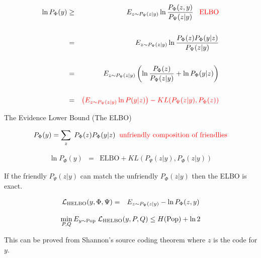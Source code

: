 {\huge
\begin{eqnarray*}
        \ln P_\Phi(y) & \geq & E_{z \sim P_\Psi(z|y)} \ln \frac{P_\Phi(z,y)}{P_\Psi(z|y)}\;\;\;\mbox{\color{red} ELBO} \\
        \\
        & = & E_{z \sim P_\Psi(z|y)} \ln \frac{P_\Phi(z)P_\Phi(y|z)}{P_\Psi(z|y)} \\
        \\
        & = & E_{z \sim P_\Psi(z|y)} \left(\ln \frac{P_\Phi(z)}{P_\Psi(z|y)} +\ln P_\Phi(y|z)\right) \\
        \\
        & = & {\color{red} \left(E_{z \sim P_\Psi(z|y)} \ln P(y|z)\right) - KL(P_\Psi(z|y),P_\Phi(z))}
\end{eqnarray*}
}

{The Evidence Lower Bound (The ELBO)}

$$P_\Phi(y) = \sum_z\;P_\Phi(z)P_\Phi(y|z)\;\;\mbox{\color{red} unfriendly composition of friendlies}$$

\begin{eqnarray*}
\ln P_\Phi(y) & = & \mathrm{ELBO} + KL(P_\Psi(z|y),P_\Phi(z|y))
\end{eqnarray*}


\vfill
{\color{red} If the friendly $P_\Psi(z|y)$ can match the unfriendly $P_\Phi(z|y)$ then the ELBO is exact.}



\begin{eqnarray*}
{\cal L}_{\mathrm{HELBO}}(y,\Phi,\Psi) &  = &  E_{z \sim P_\Psi(z|y)} - \ln P_\Phi(z,y)
\end{eqnarray*}


\vfill
{\color{red} $$\min_{P,Q} E_{y \sim \mathrm{Pop}}\;{\cal L}_{\mathrm{HELBO}}(y,P,Q) \leq H(\mathrm{Pop}) + \ln 2$$}

\vfill
This can be proved from Shannon's source coding theorem where $z$ is the code for $y$.
